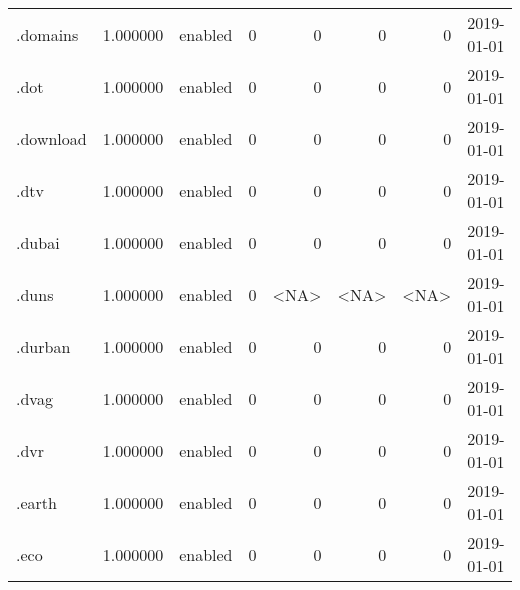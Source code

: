 \begin{tabular}{lrlrrrrl}
.domains                  &          1.000000 &         enabled &                           0 &                           0 &                           0 &                   0 &           2019-01-01 \\
.dot                      &          1.000000 &         enabled &                           0 &                           0 &                           0 &                   0 &           2019-01-01 \\
.download                 &          1.000000 &         enabled &                           0 &                           0 &                           0 &                   0 &           2019-01-01 \\
.dtv                      &          1.000000 &         enabled &                           0 &                           0 &                           0 &                   0 &           2019-01-01 \\
.dubai                    &          1.000000 &         enabled &                           0 &                           0 &                           0 &                   0 &           2019-01-01 \\
.duns                     &          1.000000 &         enabled &                           0 &                        <NA> &                        <NA> &                <NA> &           2019-01-01 \\
.durban                   &          1.000000 &         enabled &                           0 &                           0 &                           0 &                   0 &           2019-01-01 \\
.dvag                     &          1.000000 &         enabled &                           0 &                           0 &                           0 &                   0 &           2019-01-01 \\
.dvr                      &          1.000000 &         enabled &                           0 &                           0 &                           0 &                   0 &           2019-01-01 \\
.earth                    &          1.000000 &         enabled &                           0 &                           0 &                           0 &                   0 &           2019-01-01 \\
.eco                      &          1.000000 &         enabled &                           0 &                           0 &                           0 &                   0 &           2019-01-01 \\

\end{tabular}
